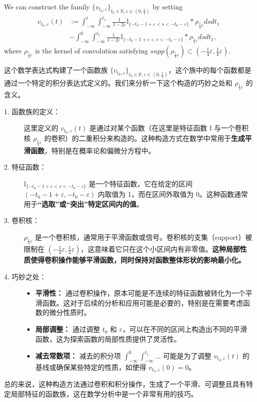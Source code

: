 We can construct the family
$\{v_{t_0,\varepsilon}\}_{t_{0}\in\mathbb{R},\varepsilon\in(0,\frac{1}{4})}$
by setting
\begin{equation}
\label{}
\begin{split}
v_{t_0,\varepsilon}(t)&:=\int_{-\infty}^{t}\int_{-\infty}^{t_{1}}\frac{1}
{1-2\varepsilon}\mathbb{I}_{\{-t_{0}-1+\varepsilon< s<-t_{0}-\varepsilon\}}
*\rho_{\frac{1}{4}\varepsilon}dsdt_{1}
\\&-\int_{-\infty}^{0}\int_{-\infty}^{t_{1}}\frac{1}{1-2\varepsilon}
\mathbb{I}_{\{-t_{0}-1+\varepsilon< s<-t_{0}-\varepsilon\}}*\rho_{\frac{1}{4}\varepsilon}dsdt_{1},
\end{split}
\end{equation}
where $\rho_{\frac{1}{4}\varepsilon}$ is the kernel of convolution satisfying $supp(\rho_{\frac{1}{4}\varepsilon})
\subset (-\frac{1}{4}\varepsilon,\frac{1}{4}\varepsilon)$.
\begin{remark}
  这个数学表达式构建了一个函数族 \(\{v_{t_0,\varepsilon}\}_{t_{0}\in\mathbb{R},\varepsilon\in(0,\frac{1}{4})}\)，这个族中的每个函数都是通过一个特定的积分表达式定义的。我们来分析一下这个构造的巧妙之处和 \(\rho_{\frac{1}{4}\varepsilon}\) 的含义。
\begin{description}
  \item[1. 函数族的定义：] 这里定义的 \(v_{t_0,\varepsilon}(t)\) 是通过对某个函数（在这里是特征函数 \(\mathbb{I}\) 与一个卷积核 \(\rho_{\frac{1}{4}\varepsilon}\) 的卷积）的二重积分来构造的。这种构造方式在数学中常用于\textbf{生成平滑函数}，特别是在概率论和偏微分方程中。
  \item[2. 特征函数：] \(\mathbb{I}_{\{-t_{0}-1+\varepsilon< s<-t_{0}-\varepsilon\}}\) 是一个特征函数，它在给定的区间 \((-t_{0}-1+\varepsilon, -t_{0}-\varepsilon)\) 内取值为 1，而在区间外取值为 0。这种函数通常用于\textbf{“选取”或“突出”特定区间内的值}。
  \item[3. 卷积核：] \(\rho_{\frac{1}{4}\varepsilon}\) 是一个卷积核，通常用于平滑函数或信号。卷积核的支集（support）被限制在 \((-{\frac{1}{4}\varepsilon}, {\frac{1}{4}\varepsilon})\)，这意味着它只在这个小区间内有非零值。\textbf{这种局部性质使得卷积操作能够平滑函数，同时保持对函数整体形状的影响最小化。}
  \item[4. 巧妙之处：] \begin{itemize}
    \item \textbf{平滑性：} 通过卷积操作，原本可能是不连续的特征函数被转化为一个平滑函数。这对于后续的分析和应用可能是必要的，特别是在需要考虑函数的微分性质时。
    \item \textbf{局部调整：} 通过调整 \(t_0\) 和 \(\varepsilon\)，可以在不同的区间上构造出不同的平滑函数，这为探索函数的局部性质提供了灵活性。
    \item \textbf{减去常数项：} 减去的积分项 \(\int_{-\infty}^{0}\int_{-\infty}^{t_{1}}...\) 可能是为了调整 \(v_{t_0,\varepsilon}(t)\) 的基线或确保某些特定的性质，如使得 \(v_{t_0,\varepsilon}(0) = 0\)。
  \end{itemize}
\end{description}
总的来说，这种构造方法通过卷积和积分操作，生成了一个平滑、可调整且具有特定局部特征的函数族，这在数学分析中是一个非常有用的技巧。
\end{remark}
